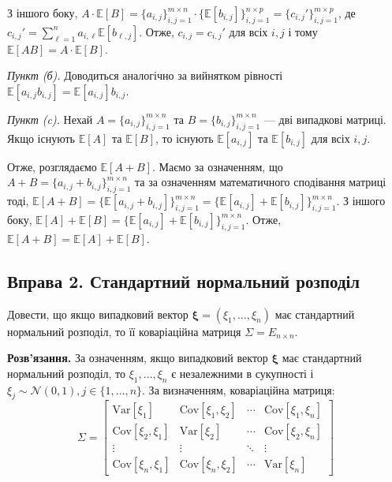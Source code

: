 \documentclass{hw_template}
\begin{document}
З іншого боку, $A\cdot\mathbb{E}[B] = \{a_{i,j}\}_{i,j=1}^{m\times n} \cdot \{\mathbb{E}[b_{i,j}]\}_{i,j=1}^{n\times p} = \{c_{i,j}'\}_{i,j=1}^{m \times p}$, де $c_{i,j}' = \sum_{\ell=1}^{n} a_{i,\ell}\mathbb{E}[b_{\ell,j}]$. Отже, $c_{i,j}=c_{i,j}'$ для всіх $i,j$ і тому $\mathbb{E}[AB] = A\cdot\mathbb{E}[B]$.

\textit{Пункт (б).} Доводиться аналогічно за вийнятком рівності $\mathbb{E}[a_{i,j}b_{i,j}]=\mathbb{E}[a_{i,j}]b_{i,j}$.

\textit{Пункт (c).} Нехай $A=\{a_{i,j}\}_{i,j=1}^{m \times n}$ та $B=\{b_{i,j}\}_{i,j=1}^{m \times n}$ --- дві випадкові матриці. Якщо існують $\mathbb{E}[A]$ та $\mathbb{E}[B]$, то існують $\mathbb{E}[a_{i,j}]$ та $\mathbb{E}[b_{i,j}]$ для всіх $i,j$.

Отже, розглядаємо $\mathbb{E}[A+B]$. Маємо за означенням, що $A+B=\{a_{i,j}+b_{i,j}\}_{i,j=1}^{m \times n}$ та за означенням математичного сподівання матриці тоді, $\mathbb{E}[A+B] = \{\mathbb{E}[a_{i,j}+b_{i,j}]\}_{i,j=1}^{m \times n} = \{\mathbb{E}[a_{i,j}]+\mathbb{E}[b_{i,j}]\}_{i,j=1}^{m \times n}$. З іншого боку, $\mathbb{E}[A] + \mathbb{E}[B] = \{\mathbb{E}[a_{i,j}]+\mathbb{E}[b_{i,j}]\}_{i,j=1}^{m \times n}$. Отже, $\mathbb{E}[A+B] = \mathbb{E}[A] + \mathbb{E}[B]$.

\pagebreak

\subsection{Вправа 2. Стандартний нормальний розподіл}

\begin{problem}
    Довести, що якщо випадковий вектор $\boldsymbol{\xi} = (\xi_1,\dots,\xi_n)$ має стандартний нормальний розподіл, то її коваріаційна матриця $\Sigma = E_{n \times n}$.
\end{problem}

\textbf{Розв'язання.} За означенням, якщо випадковий вектор $\boldsymbol{\xi}$ має стандартний нормальний розподіл, то $\xi_1,\dots,\xi_n$ є незалежними в сукупності і $\xi_j \sim \mathcal{N}(0,1), j \in \{1,\dots,n\}$. За визначенням, коваріаційна матриця:
\begin{equation*}
    \Sigma = \begin{bmatrix}
        \text{Var}[\xi_1] & \text{Cov}[\xi_1,\xi_2] & \cdots & \text{Cov}[\xi_1,\xi_n] \\
        \text{Cov}[\xi_2,\xi_1] & \text{Var}[\xi_2] & \cdots & \text{Cov}[\xi_2,\xi_n] \\
        \vdots & \vdots & \ddots & \vdots \\
        \text{Cov}[\xi_n,\xi_1] & \text{Cov}[\xi_n,\xi_2] & \cdots & \text{Var}[\xi_n]
    \end{bmatrix}
\end{equation*}
\end{document}

